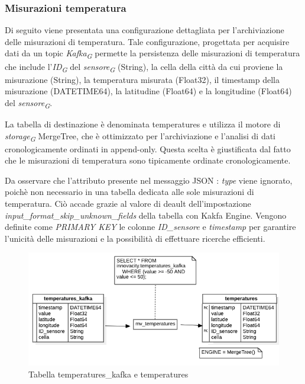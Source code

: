 \subsubsection{Misurazioni temperatura} \label{sec:misurazioni_temperatures}

Di seguito viene presentata una configurazione dettagliata per l'archiviazione delle misurazioni di temperatura. Tale configurazione, progettata per acquisire dati da un topic \textit{Kafka}\textsubscript{\textit{G}} permette la persistenza delle misurazioni di temperatura che include l'\textit{ID}\textsubscript{\textit{G}} del \textit{sensore}\textsubscript{\textit{G}} (String), la cella della città da cui proviene la misurazione (String), la temperatura misurata (Float32), il timestamp della misurazione (DATETIME64), la latitudine (Float64) e la longitudine (Float64) del \textit{sensore}\textsubscript{\textit{G}}.

La tabella di destinazione è denominata temperatures e utilizza il motore di \textit{storage}\textsubscript{\textit{G}} MergeTree, che è ottimizzato per l'archiviazione e l'analisi di dati cronologicamente ordinati in append-only. Questa scelta è giustificata dal fatto che le misurazioni di temperatura sono tipicamente ordinate cronologicamente.

Da osservare che l'attributo presente nel messaggio JSON : \textit{type} viene ignorato, poichè non necessario in una tabella dedicata alle sole misurazioni di temperatura. Ciò accade grazie al valore di deault dell'impostazione \textit{input\_format\_skip\_unknown\_fields} della tabella con Kakfa Engine.
Vengono definite come \textit{PRIMARY KEY} le colonne \textit{ID\_sensore} e \textit{timestamp} per garantire l'unicità delle misurazioni e la possibilità di effettuare ricerche efficienti.

\begin{figure}[H]
	\centering
	\includegraphics[width=1\textwidth]{../Images/SpecificaTecnica/temperatures.png}
	\caption{Tabella temperatures\_kafka e temperatures}
	\label{fig:temperatures}
\end{figure}
    
